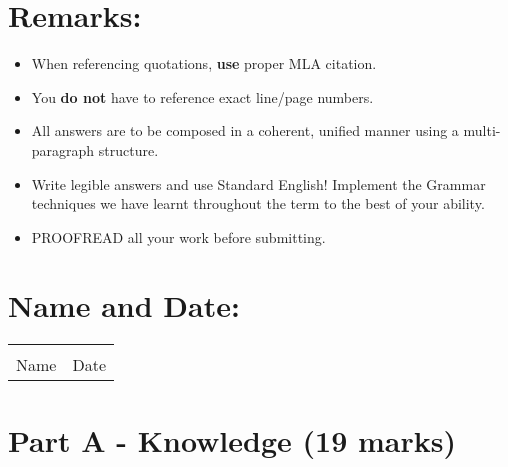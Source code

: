\documentclass[12pt]{article} %
\begin{document}
  \section{Remarks:}
  \begin{itemize}
    \item When referencing quotations, \textbf{use} proper MLA citation.
    \item You \textbf{do not} have to reference exact line/page numbers.
    \item All answers are to be composed in a coherent, unified manner using a multi-paragraph structure.
    \item Write legible answers and use Standard English! Implement the Grammar techniques we have learnt throughout the term to the best of your ability.
    \item PROOFREAD all your work before submitting.
  \end{itemize}

	\section{Name and Date:}

  \vspace*{0.1cm}

	\begin{center}
	\noindent\begin{tabular}{ll}
		\makebox[3in]{\hrulefill} & \makebox[3in]{\hrulefill}\\
		Name & Date\\[8ex]%
	\end{tabular}
	\end{center}
	\newpage


\section*{Part A - Knowledge (19 marks)}
\end{document}
